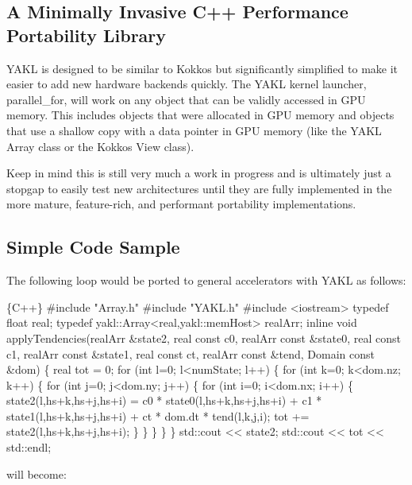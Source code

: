 \subsection*{A Minimally Invasive C++ Performance Portability Library}

Y\+A\+KL is designed to be similar to Kokkos but significantly simplified to make it easier to add new hardware backends quickly. The Y\+A\+KL kernel launcher, {\ttfamily parallel\+\_\+for}, will work on any object that can be validly accessed in G\+PU memory. This includes objects that were allocated in G\+PU memory and objects that use a shallow copy with a data pointer in G\+PU memory (like the Y\+A\+KL Array class or the Kokkos View class).

Keep in mind this is still very much a work in progress and is ultimately just a stopgap to easily test new architectures until they are fully implemented in the more mature, feature-\/rich, and performant portability implementations.

\subsection*{Simple Code Sample}

The following loop would be ported to general accelerators with Y\+A\+KL as follows\+:


\begin{DoxyCode}
\{C++\}
#include "Array.h"
#include "YAKL.h"
#include <iostream>
typedef float real;
typedef yakl::Array<real,yakl::memHost> realArr;
inline void applyTendencies(realArr &state2, real const c0, realArr const &state0,
                                             real const c1, realArr const &state1,
                                             real const ct, realArr const &tend,
                                             Domain const &dom) \{
  real tot = 0;
  for (int l=0; l<numState; l++) \{
    for (int k=0; k<dom.nz; k++) \{
      for (int j=0; j<dom.ny; j++) \{
        for (int i=0; i<dom.nx; i++) \{
          state2(l,hs+k,hs+j,hs+i) = c0 * state0(l,hs+k,hs+j,hs+i) +
                                     c1 * state1(l,hs+k,hs+j,hs+i) +
                                     ct * dom.dt * tend(l,k,j,i);
          tot += state2(l,hs+k,hs+j,hs+i);
        \}
      \}
    \}
  \}
\}
std::cout << state2;
std::cout << tot << std::endl;
\end{DoxyCode}


will become\+:


